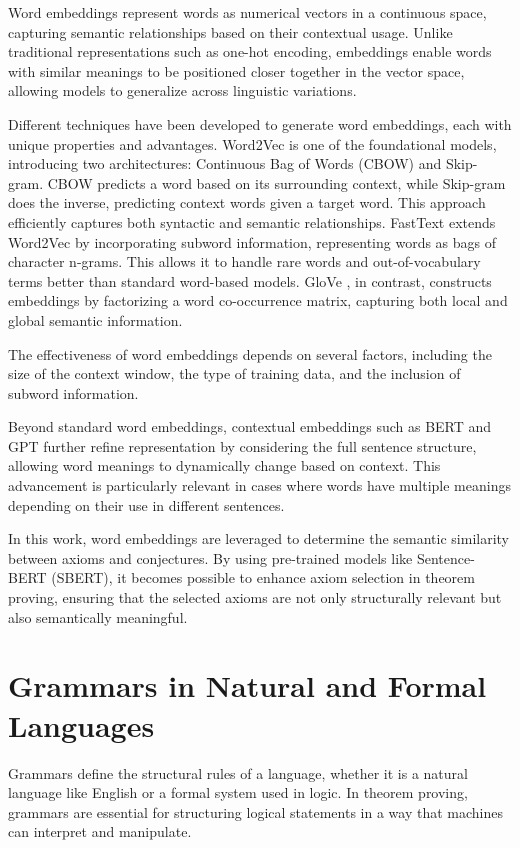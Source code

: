 \documentclass[english,version-2020-11]{uzl-thesis}
\begin{document}
Word embeddings represent words as numerical vectors in a continuous space, capturing semantic relationships based on their contextual usage. Unlike traditional representations such as one-hot encoding, embeddings enable words with similar meanings to be positioned closer together in the vector space, allowing models to generalize across linguistic variations. 

Different techniques have been developed to generate word embeddings, each with unique properties and advantages. Word2Vec \cite{Mikolov2013} is one of the foundational models, introducing two architectures: Continuous Bag of Words (CBOW) and Skip-gram. CBOW predicts a word based on its surrounding context, while Skip-gram does the inverse, predicting context words given a target word. This approach efficiently captures both syntactic and semantic relationships. FastText \cite{Bojanowski2017} extends Word2Vec by incorporating subword information, representing words as bags of character n-grams. This allows it to handle rare words and out-of-vocabulary terms better than standard word-based models. GloVe \cite{Pennington2014}, in contrast, constructs embeddings by factorizing a word co-occurrence matrix, capturing both local and global semantic information.

The effectiveness of word embeddings depends on several factors, including the size of the context window, the type of training data, and the inclusion of subword information.

Beyond standard word embeddings, contextual embeddings such as BERT and GPT \cite{Devlin2019} further refine representation by considering the full sentence structure, allowing word meanings to dynamically change based on context. This advancement is particularly relevant in cases where words have multiple meanings depending on their use in different sentences.

In this work, word embeddings are leveraged to determine the semantic similarity between axioms and conjectures. By using pre-trained models like Sentence-BERT (SBERT), it becomes possible to enhance axiom selection in theorem proving, ensuring that the selected axioms are not only structurally relevant but also semantically meaningful.


\section{Grammars in Natural and Formal Languages}

Grammars define the structural rules of a language, whether it is a natural language like English or a formal system used in logic. In theorem proving, grammars are essential for structuring logical statements in a way that machines can interpret and manipulate.
\end{document}
